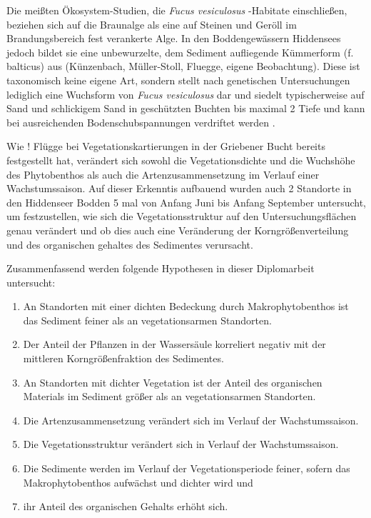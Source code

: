 Die meißten Ökosystem-Studien, die \textit{Fucus vesiculosus} -Habitate einschließen, beziehen sich auf die Braunalge als eine auf Steinen und Geröll im Brandungsbereich fest verankerte Alge.
In den Boddengewässern Hiddensees jedoch bildet sie eine unbewurzelte, dem Sediment aufliegende Kümmerform (f. balticus) aus (Künzenbach, Müller-Stoll, Fluegge, eigene Beobachtung).  Diese ist taxonomisch keine eigene Art, sondern stellt nach genetischen Untersuchungen lediglich eine Wuchsform von \textit{Fucus vesiculosus} dar \citep{athanasiadis_1996} und siedelt typischerweise auf Sand und schlickigem Sand in geschützten Buchten bis maximal \unit{2}{\metre} Tiefe \citep{HELCOM_2013} und kann bei ausreichenden Bodenschubspannungen verdriftet werden \citep{canal-verges_2010}.

Wie ! Flügge bei Vegetationskartierungen in der Griebener Bucht bereits festgestellt hat, verändert sich sowohl die Vegetationsdichte und die Wuchshöhe des Phytobenthos als auch die Artenzusammensetzung im Verlauf einer Wachstumssaison. Auf dieser Erkenntis aufbauend wurden auch 2 Standorte in den Hiddenseer Bodden 5 mal von Anfang Juni bis Anfang September untersucht, um festzustellen, wie sich die Vegetationsstruktur auf den Untersuchungsflächen genau verändert und ob dies auch eine Veränderung der Korngrößenverteilung und des organischen gehaltes des Sedimentes verursacht.


Zusammenfassend werden folgende Hypothesen in dieser Diplomarbeit untersucht: 
\\
\begin{enumerate}[label=\Roman{*},leftmargin=1.5cm]
\item An Standorten mit einer dichten Bedeckung durch Makrophytobenthos ist das Sediment feiner als an vegetationsarmen Standorten.
\item Der Anteil der Pflanzen in der Wassersäule korreliert negativ mit der mittleren Korngrößenfraktion des Sedimentes.
\item An Standorten mit dichter Vegetation ist der Anteil des organischen Materials im Sediment größer als an vegetationsarmen Standorten.
\item Die Artenzusammensetzung verändert sich im Verlauf der Wachstumssaison.
\item Die Vegetationsstruktur verändert sich in Verlauf der Wachstumssaison.
\item Die Sedimente werden im Verlauf der Vegetationsperiode feiner, sofern das Makrophytobenthos aufwächst und dichter wird und 
\item ihr Anteil des organischen Gehalts erhöht sich.
\end{enumerate}
